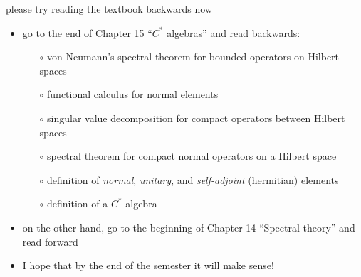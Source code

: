 \documentclass[10pt,hyperref]{beamer}
\begin{document}
\begin{frame}{please try reading the textbook backwards now}

\begin{itemize}
\item go to the end of Chapter 15 ``$C^*$ algebras'' and read backwards:
    \begin{itemize}
    \item[$\circ$] von Neumann's spectral theorem for bounded operators on Hilbert spaces
    \item[$\circ$] functional calculus for normal elements
    \item[$\circ$] singular value decomposition for compact operators between Hilbert spaces
    \item[$\circ$] spectral theorem for compact normal operators on a Hilbert space
    \item[$\circ$] definition of \emph{normal}, \emph{unitary}, and \emph{self-adjoint} (hermitian) elements
    \item[$\circ$] definition of a $C^*$ algebra
    \end{itemize}
\item on the other hand, go to the beginning of Chapter 14 ``Spectral theory'' and read forward
\item I hope that by the end of the semester it will make sense!
\end{itemize}
\end{frame}
\end{document}
